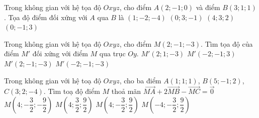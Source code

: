 \begin{ex}%
	 Trong không gian với hệ tọa độ $Oxyz$, cho điểm $A(2;-1;0)$ và điểm $B(3;1;1)$. Tọa độ điểm đối xứng với $A$ qua $B$ là
	\choice 
		 {$(1;-2;-4)$}
		 {$(0;3;-1)$}
		 {\True $(4;3;2)$}
		 {$(0;-1;3)$}
\end{ex}

\begin{ex}%
	Trong không gian với hệ tọa độ $Oxyz$, cho điểm $M(2;-1;-3)$. Tìm tọa độ của điểm $M'$ đối xứng với điểm $M$  qua trục $Oy$.
	\choice 
		{$M'(2;1;-3)$} 
		{\True $M'(-2;-1;3)$} 
		{$M'(2;-1;-3)$} 
		 {$M'(-2;-1;-3)$}
\end{ex}

\begin{ex}%
	 Trong không gian với hệ toạ độ $Oxyz$, cho ba điểm $A(1;1;1)$, $B(5;-1;2)$, $C(3;2;-4)$. Tìm toạ độ điểm $M$ thoả mãn $\overrightarrow{MA}+2\overrightarrow{MB}-\overrightarrow{MC}=\overrightarrow{0}$
	 \choice
		 {$M\left(4;-\dfrac{3}{2};-\dfrac{9}{2}\right)$}
		 {$M\left(4;\dfrac{3}{2};\dfrac{9}{2}\right)$}
		 {\True $M\left(4;-\dfrac{3}{2};\dfrac{9}{2}\right)$}
		 {$M\left(-4;-\dfrac{3}{2};\dfrac{9}{2}\right)$}
\end{ex}

